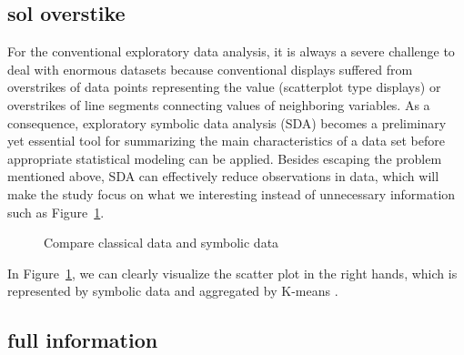 \documentclass[article]{jss}
\begin{document}
\subsection{sol overstike}
For the conventional exploratory data analysis, it is always a severe challenge to deal with enormous datasets because conventional displays suffered from overstrikes of data points representing the value (scatterplot type displays) or overstrikes of line segments connecting values of neighboring variables. As a consequence, exploratory symbolic data analysis (SDA) becomes a preliminary yet essential tool for summarizing the main characteristics of a data set before appropriate statistical modeling can be applied. Besides escaping the problem mentioned above, SDA can effectively reduce observations in data, which will make the study focus on what we interesting instead of unnecessary information such as Figure~\ref{fig:compare}.

\begin{figure}[htbp]
\centering
{}
\caption{\label{fig:compare} Compare classical data and symbolic data}
\end{figure}

In Figure~\ref{fig:compare}, we can clearly visualize the scatter plot in the right hands, which is represented by symbolic data and aggregated by K-means \cite{macqueen:1967}. 


\subsection{full information}
\end{document}
